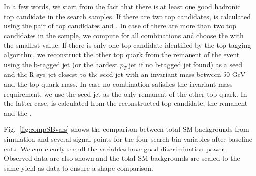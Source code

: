 In a few words, we start from the fact that there is at least one good hadronic top candidate in the search samples. 
If there are two top candidates, \MTTwo is calculated using the pair of top 
candidates and \MET. In case of there are more than two top candidates
in the sample, we compute \MTTwo for all combinations and choose the 
\MTTwo with the smallest value. If there is only one top candidate identified
by the top-tagging algorithm, we reconstruct the other top 
quark from the remanent of the event using the b-tagged jet (or the hardest $p_{T}$ jet if no b-tagged jet found) as a seed and the R-sys 
jet closest to the seed jet with an invariant mass between 50 GeV and 
the top quark mass. In case no combination satisfies the invariant mass
requirement, we use the seed jet as the only remanent of the other 
top quark. In the latter case, \MTTwo is calculated from the reconstructed top candidate, the remanent and the \MET.

Fig.~\ref{fig:compSBvars} 
shows the comparison between total SM backgrounds from simulation and several signal points for the four search bin variables after baseline cuts. We can clearly see all the variables have good discrimination power. Observed data are also shown and the total SM backgrounds are scaled to the same yield as data to ensure a shape comparison. %

